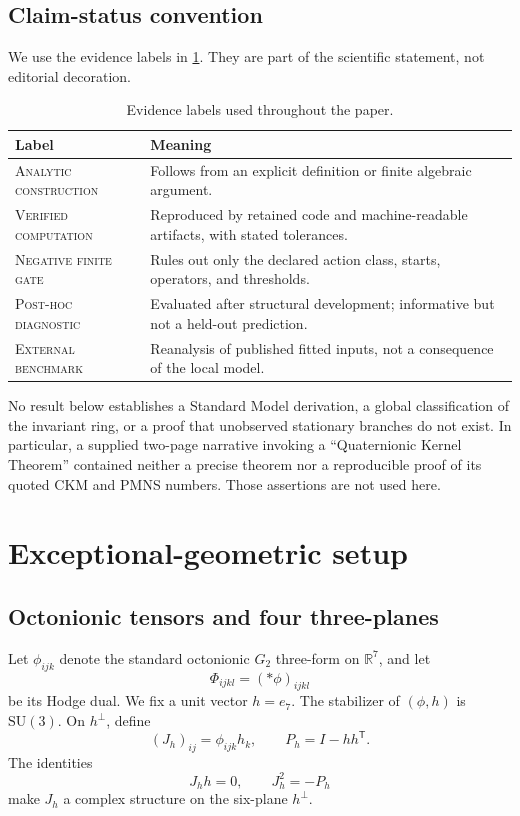\documentclass[11pt]{article}
\newcommand{\SU}{\mathrm{SU}}
\newcommand{\status}[1]{\textsc{#1}}
\begin{document}
\subsection{Claim-status convention}

We use the evidence labels in \cref{tab:status}.  They are part of the scientific statement, not editorial decoration.

\begin{table}[t]
\centering
\caption{Evidence labels used throughout the paper.}
\label{tab:status}
\begin{tabularx}{\textwidth}{@{}p{}X@{}}
\toprule
Label & Meaning \\
\midrule
\status{Analytic construction} & Follows from an explicit definition or finite algebraic argument. \\
\status{Verified computation} & Reproduced by retained code and machine-readable artifacts, with stated tolerances. \\
\status{Negative finite gate} & Rules out only the declared action class, starts, operators, and thresholds. \\
\status{Post-hoc diagnostic} & Evaluated after structural development; informative but not a held-out prediction. \\
\status{External benchmark} & Reanalysis of published fitted inputs, not a consequence of the local model. \\
\bottomrule
\end{tabularx}
\end{table}

No result below establishes a Standard Model derivation, a global classification of the invariant ring, or a proof that unobserved stationary branches do not exist.  In particular, a supplied two-page narrative invoking a ``Quaternionic Kernel Theorem'' contained neither a precise theorem nor a reproducible proof of its quoted CKM and PMNS numbers.  Those assertions are not used here.

\section{Exceptional-geometric setup}
\label{sec:setup}

\subsection{Octonionic tensors and four three-planes}

Let $\phi_{ijk}$ denote the standard octonionic $G_2$ three-form on $\mathbb R^7$, and let
\begin{equation}
  \Phi_{ijkl}=(*\phi)_{ijkl}
\end{equation}
be its Hodge dual.  We fix a unit vector $h=e_7$.  The stabilizer of $(\phi,h)$ is $\SU(3)$.  On $h^\perp$, define
\begin{equation}
  (J_h)_{ij}=\phi_{ijk}h_k,\qquad
  P_h=I-hh^{\mathsf T}.
  \label{eq:Jh}
\end{equation}
The identities
\begin{equation}
  J_h h=0,\qquad J_h^2=-P_h
  \label{eq:complex-identity}
\end{equation}
make $J_h$ a complex structure on the six-plane $h^\perp$.
\end{document}
